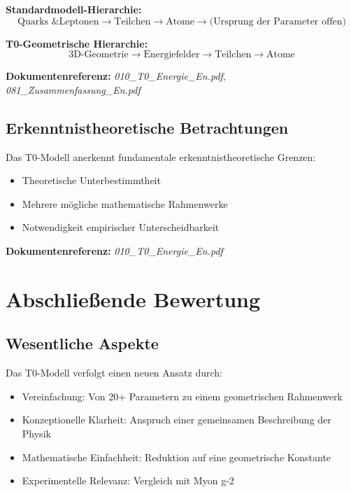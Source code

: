 \textbf{Standardmodell-Hierarchie:}
\begin{equation}
	\text{Quarks \& Leptonen} \rightarrow \text{Teilchen} \rightarrow \text{Atome} \rightarrow \text{(Ursprung der Parameter offen)}
\end{equation}

\textbf{T0-Geometrische Hierarchie:}
\begin{equation}
	\text{3D-Geometrie} \rightarrow \text{Energiefelder} \rightarrow \text{Teilchen} \rightarrow \text{Atome}
\end{equation}

\textbf{Dokumentenreferenz:} \textit{010\_T0\_Energie\_En.pdf}, \textit{081\_Zusammenfassung\_En.pdf}

\subsection{Erkenntnistheoretische Betrachtungen}

Das T0-Modell anerkennt fundamentale erkenntnistheoretische Grenzen:
\begin{itemize}
	\item Theoretische Unterbestimmtheit
	\item Mehrere mögliche mathematische Rahmenwerke
	\item Notwendigkeit empirischer Unterscheidbarkeit
\end{itemize}

\textbf{Dokumentenreferenz:} \textit{010\_T0\_Energie\_En.pdf}

\section{Abschließende Bewertung}

\subsection{Wesentliche Aspekte}

Das T0-Modell verfolgt einen neuen Ansatz durch:

\begin{itemize}
	\item Vereinfachung: Von 20+ Parametern zu einem geometrischen Rahmenwerk
	\item Konzeptionelle Klarheit: Anspruch einer gemeinsamen Beschreibung der Physik
	\item Mathematische Einfachheit: Reduktion auf eine geometrische Konstante
	\item Experimentelle Relevanz: Vergleich mit Myon g-2
\end{itemize}

